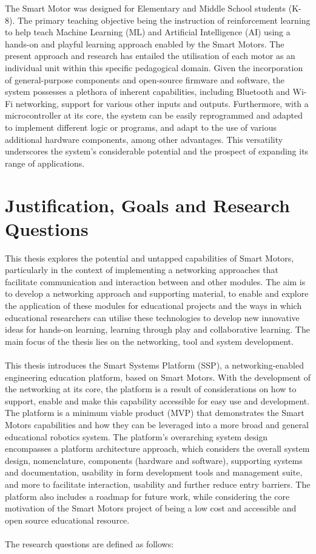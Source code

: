 The Smart Motor was designed for Elementary and Middle School students (K-8). The primary teaching objective being the instruction of reinforcement learning to help teach Machine Learning (ML) and Artificial Intelligence (AI) using a hands-on and playful learning approach enabled by the Smart Motors. The present approach and research has entailed the utilisation of each motor as an individual unit within this specific pedagogical domain. 
Given the incorporation of general-purpose components and open-source firmware and software, the system possesses a plethora of inherent capabilities, including Bluetooth and Wi-Fi networking, support for various other inputs and outputs. Furthermore, with a microcontroller at its core, the system can be easily reprogrammed and adapted to implement different logic or programs, and adapt to the use of various additional hardware components, among other advantages. This versatility underscores the system's considerable potential and the prospect of expanding its range of applications. \citep{dahal_designing_2024}

\section{\label{sec:intro_res_quest}Justification, Goals and Research Questions}

This thesis explores the potential and untapped capabilities of Smart Motors, particularly in the context of implementing a networking approaches that facilitate communication and interaction between  and other modules. The aim is to develop a networking approach and supporting material, to enable and explore the application of these modules for educational projects and the ways in which educational researchers can utilise these technologies to develop new innovative ideas for hands-on learning, learning through play and collaborative learning. The main focus of the thesis lies on the networking, tool and system development.
\\\\
This thesis introduces the Smart Systems Platform (SSP), a networking-enabled engineering education platform, based on Smart Motors.
With the development of the networking at its core, the platform is a result of considerations on how to support, enable and make this capability accessible for easy use and development. 
The platform is a minimum viable product (MVP) that demonstrates the Smart Motors capabilities and how they can be leveraged into a more broad and general educational robotics system. The platform's overarching system design encompasses a platform architecture approach, which considers the overall system design, nomenclature, components (hardware and software), supporting systems and documentation, usability in form development tools and management suite, and more to facilitate interaction, usability and further reduce entry barriers. The platform also includes a roadmap for future work, while considering the core motivation of the Smart Motors project of being a low cost and accessible and open source educational resource.
\\\\
The research questions are defined as follows:

